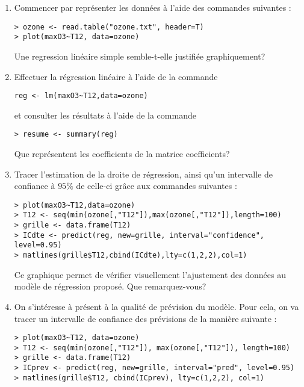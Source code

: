 \documentclass{td_um}
\providecommand{\1}{\mathds{1}}
\begin{document}
\begin{enumerate}
\item Commencer par représenter les données à l'aide des commandes suivantes :
\begin{verbatim}
> ozone <- read.table("ozone.txt", header=T)
> plot(maxO3~T12, data=ozone)
\end{verbatim}
Une regression linéaire simple semble-t-elle justifiée graphiquement?
\item Effectuer la régression linéaire à l'aide de la commande
\begin{verbatim}
reg <- lm(maxO3~T12,data=ozone)
\end{verbatim}
et consulter les résultats à l'aide de la commande
\begin{verbatim}
> resume <- summary(reg)
\end{verbatim}
Que représentent les coefficients de la matrice coefficients?
\item Tracer l'estimation de la droite de régression, ainsi qu'un intervalle de confiance à $95 \%$ de celle-ci grâce aux commandes suivantes :
\begin{verbatim}
> plot(maxO3~T12,data=ozone)
> T12 <- seq(min(ozone[,"T12"]),max(ozone[,"T12"]),length=100)
> grille <- data.frame(T12)
> ICdte <- predict(reg, new=grille, interval="confidence", level=0.95)
> matlines(grille$T12,cbind(ICdte),lty=c(1,2,2),col=1)
\end{verbatim}
Ce graphique permet de vérifier visuellement l'ajustement des données au modèle de régression proposé. Que remarquez-vous?
\item On s'intéresse à présent à la qualité de prévision du modèle. Pour cela, on va tracer un intervalle de confiance des prévisions de la manière suivante :
\begin{verbatim}
> plot(maxO3~T12, data=ozone)
> T12 <- seq(min(ozone[,"T12"]), max(ozone[,"T12"]), length=100)
> grille <- data.frame(T12)
> ICprev <- predict(reg, new=grille, interval="pred", level=0.95)
> matlines(grille$T12, cbind(ICprev), lty=c(1,2,2), col=1)
\end{verbatim}

\end{enumerate}
\end{document}
